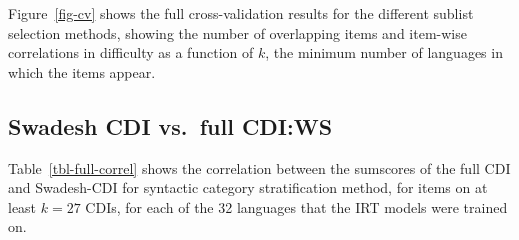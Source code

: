 \documentclass[
  letterpaper,
  DIV=11,
  numbers=noendperiod]{scrartcl}
\begin{document}
Figure~\ref{fig-cv} shows the full cross-validation results for the
different sublist selection methods, showing the number of overlapping
items and item-wise correlations in difficulty as a function of \(k\),
the minimum number of languages in which the items appear.

\subsection{Swadesh CDI vs.~full
CDI:WS}\label{swadesh-cdi-vs.-full-cdiws}

Table~\ref{tbl-full-correl} shows the correlation between the sumscores
of the full CDI and Swadesh-CDI for syntactic category stratification
method, for items on at least \(k=27\) CDIs, for each of the 32
languages that the IRT models were trained on.
\end{document}
